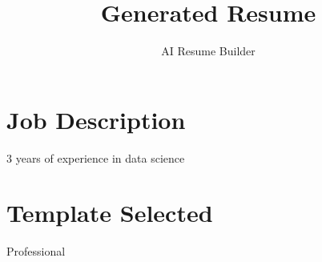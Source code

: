 \documentclass{article}
\title{Generated Resume}
\author{AI Resume Builder}
\date{}
\begin{document}
\normalsize
\maketitle
\section{Job Description}
\label{sec:JobDescription}
3 years of experience in data science

\section{Template Selected}
\label{sec:TemplateSelected}
Professional
\end{document}
